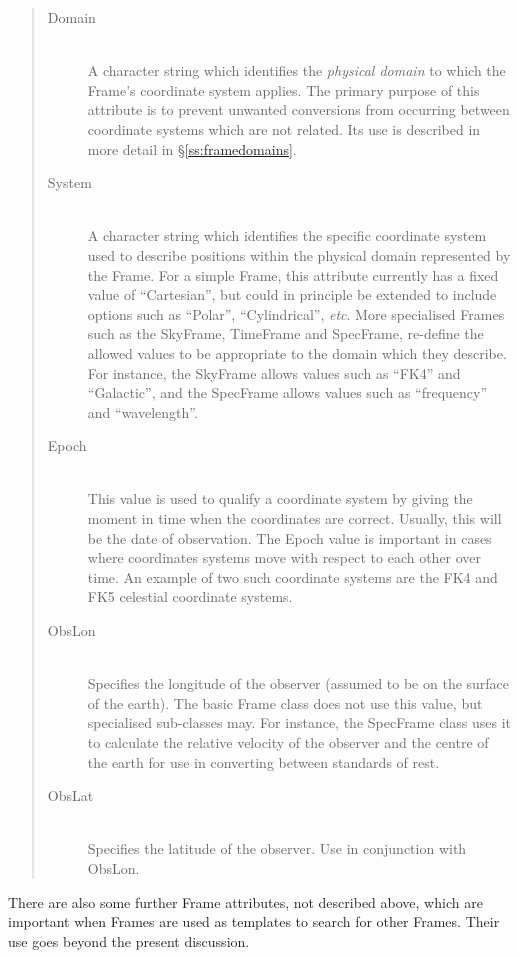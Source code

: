 \documentclass[twoside,11pt]{starlink}
\providecommand{\secref}[1]{\S\ref{#1}}
\begin{document}
\begin{quote}
\begin{description}
\item[Domain]\mbox{}\\
A character string which identifies the \emph{physical domain} to
which the Frame's coordinate system applies. The primary purpose of
this attribute is to prevent unwanted conversions from occurring
between coordinate systems which are not related. Its use is described
in more detail in \secref{ss:framedomains}.

\item[System]\mbox{}\\
A character string which identifies the specific coordinate system used
to describe positions within the physical domain represented by the Frame.
For a simple Frame, this attribute currently has a fixed value of
``Cartesian'', but could in principle be extended to include options such
as ``Polar'', ``Cylindrical'', \emph{etc}. More specialised Frames such
as the SkyFrame, TimeFrame  and SpecFrame, re-define the allowed values to be
appropriate to the domain which they describe. For instance, the SkyFrame
allows values such as ``FK4'' and ``Galactic'', and the SpecFrame allows
values such as ``frequency'' and ``wavelength''.

\item[Epoch]\mbox{}\\
This value is used to qualify a coordinate system by giving the moment in
time when the coordinates are correct. Usually, this will be the date of
observation. The Epoch value is important in cases where coordinates
systems move with respect to each other over time. An example of two such
coordinate systems are the FK4 and FK5 celestial coordinate systems.

\item[ObsLon]\mbox{}\\
Specifies the longitude of the observer (assumed to be on the surface of
the earth). The basic Frame class does not use this value, but
specialised sub-classes may. For instance, the SpecFrame class uses it to
calculate the relative velocity of the observer and the centre of the
earth for use in converting between standards of rest.

\item[ObsLat]\mbox{}\\
Specifies the latitude of the observer. Use in conjunction with ObsLon.

\end{description}
\end{quote}

There are also some further Frame attributes, not described above,
which are important when Frames are used as templates to search for
other Frames. Their use goes beyond the present discussion.
\end{document}
